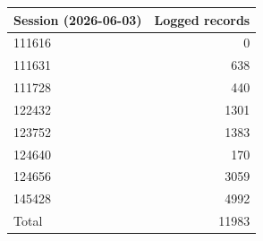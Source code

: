\begin{tabular}{lr}
Session (2026-06-03) & Logged records \\
\hline
111616 & 0 \\
111631 & 638 \\
111728 & 440 \\
122432 & 1301 \\
123752 & 1383 \\
124640 & 170 \\
124656 & 3059 \\
145428 & 4992 \\
\hline
Total & 11983 \\
\end{tabular}
